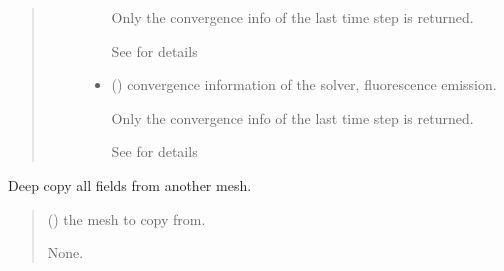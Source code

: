 \documentclass[letterpaper,10pt,english]{sphinxmanual}
\begin{document}
\begin{fulllineitems}
\begin{fulllineitems}
\begin{quote}
\begin{description}
\begin{itemize}
\sphinxAtStartPar
Only the convergence info of the last time step is returned.

\sphinxAtStartPar
See {\hyperref[\detokenize{_autosummary/nirfasterff.utils.ConvergenceInfo:nirfasterff.utils.ConvergenceInfo}]{}} for details

\item {} 
\sphinxAtStartPar
{} () \textendash{} convergence information of the solver, fluorescence emission.

\sphinxAtStartPar
Only the convergence info of the last time step is returned.

\sphinxAtStartPar
See {\hyperref[\detokenize{_autosummary/nirfasterff.utils.ConvergenceInfo:nirfasterff.utils.ConvergenceInfo}]{}} for details

\end{itemize}


\end{description}\end{quote}

\end{fulllineitems}


\begin{fulllineitems}
\label{\detokenize{_autosummary/nirfasterff.base.fluor_mesh.fluormesh:nirfasterff.base.fluor_mesh.fluormesh.from_copy}}
\pysigstartsignatures
\pysiglinewithargsret
{}
{}
{}
\pysigstopsignatures
\sphinxAtStartPar
Deep copy all fields from another mesh.
\begin{quote}\begin{description}
\sphinxAtStartPar
{} () \textendash{} the mesh to copy from.

\sphinxAtStartPar
None.

\end{description}\end{quote}

\end{fulllineitems}


\end{fulllineitems}
\end{document}
